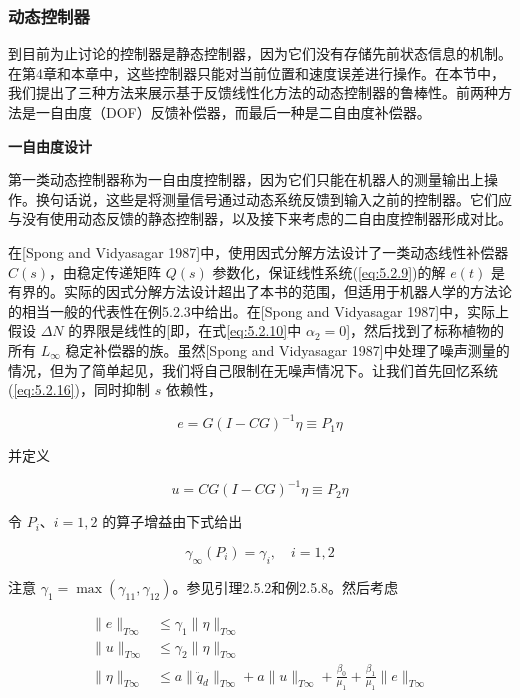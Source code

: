 \documentclass[UTF8,12pt,a4paper]{ctexart}
\begin{document}
\subsubsection{动态控制器}

到目前为止讨论的控制器是静态控制器，因为它们没有存储先前状态信息的机制。在第4章和本章中，这些控制器只能对当前位置和速度误差进行操作。在本节中，我们提出了三种方法来展示基于反馈线性化方法的动态控制器的鲁棒性。前两种方法是一自由度（DOF）反馈补偿器，而最后一种是二自由度补偿器。

\textbf{一自由度设计}

第一类动态控制器称为一自由度控制器，因为它们只能在机器人的测量输出上操作。换句话说，这些是将测量信号通过动态系统反馈到输入之前的控制器。它们应与没有使用动态反馈的静态控制器，以及接下来考虑的二自由度控制器形成对比。

在[Spong and Vidyasagar 1987]中，使用因式分解方法设计了一类动态线性补偿器 $C(s)$，由稳定传递矩阵 $Q(s)$ 参数化，保证线性系统(\ref{eq:5.2.9})的解 $e(t)$ 是有界的。实际的因式分解方法设计超出了本书的范围，但适用于机器人学的方法论的相当一般的代表性在例5.2.3中给出。在[Spong and Vidyasagar 1987]中，实际上假设 $\Delta N$ 的界限是线性的[即，在式\ref{eq:5.2.10}中 $\alpha_2 = 0$]，然后找到了标称植物的所有 $L_\infty$ 稳定补偿器的族。虽然[Spong and Vidyasagar 1987]中处理了噪声测量的情况，但为了简单起见，我们将自己限制在无噪声情况下。让我们首先回忆系统(\ref{eq:5.2.16})，同时抑制 $s$ 依赖性，

\begin{equation}\label{eq:5.2.30}
e = G(I - CG)^{-1}\eta \equiv P_1\eta
\end{equation}

并定义

\begin{equation}\label{eq:5.2.31}
u = CG(I - CG)^{-1}\eta \equiv P_2\eta
\end{equation}

令 $P_i$、$i = 1, 2$ 的算子增益由下式给出

\begin{equation}\label{eq:5.2.32}
\gamma_\infty(P_i) = \gamma_i, \quad i = 1, 2
\end{equation}

注意 $\gamma_1 = \max(\gamma_{11}, \gamma_{12})$。参见引理2.5.2和例2.5.8。然后考虑

\begin{align}
\|e\|_{T\infty} &\leq \gamma_1\|\eta\|_{T\infty} \\
\|u\|_{T\infty} &\leq \gamma_2\|\eta\|_{T\infty} \\
\|\eta\|_{T\infty} &\leq a\|\ddot{q}_d\|_{T\infty} + a\|u\|_{T\infty} + \frac{\beta_0}{\mu_1} + \frac{\beta_1}{\mu_1}\|e\|_{T\infty} \label{eq:5.2.33}
\end{align}
\end{document}
